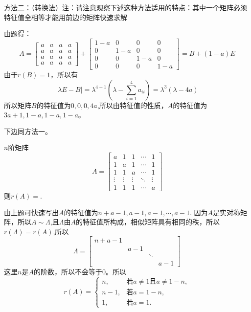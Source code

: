 \documentclass{article}
\begin{document}
\begin{jie}
方法二：（转换法）\textcolor[rgb]{1.00,0.00,0.00}{注：请注意观察下述这种方法适用的特点：其中一个矩阵必须特征值全相等才能用前边的矩阵快速求解}

由题得：
\begin{equation*}A=
  \begin{bmatrix}
    a & a& a& a \\
    a & a& a& a \\
    a & a& a& a \\
    a & a& a& a
  \end{bmatrix}+
   \begin{bmatrix}
    1-a & 0& 0& 0 \\
    0 & 1-a& 0& 0 \\
    0 & 0& 1-a& 0 \\
    0 & 0& 0& 1-a
  \end{bmatrix}=B+(1-a)E
\end{equation*}
由于$r(B)=1$，所以有
\begin{equation*}
  |\lambda E -B|=\lambda^{4-1}\left(\lambda-\sum\limits_{i=1}^{4}a_{ii}\right)=
  \lambda^{3}\left(\lambda-4a\right)
\end{equation*}
所以矩阵$B$的特征值为$0,0,0,4a$,所以由特征值的性质，$A$的特征值为$3a+1,1-a,1-a,1-a$。

下边同方法一。
\end{jie}

$n$阶矩阵
\begin{equation*}
A=
\begin{bmatrix}
  a & 1 & 1 & \cdots & 1\\
 1 & a & 1&\cdots & 1\\
 1 & 1 & a & \cdots &1\\
 \vdots&\vdots&\vdots&\ddots&\vdots\\
 1&1&1&\cdots&a
\end{bmatrix}
\end{equation*}
则$r(A)=$\underline{\hphantom{~~~~~~~~~~~~~}}.

\begin{jie}
由上题可快速写出$A$的特征值为$n+a-1,a-1,a-1,\cdots,a-1$.
因为$A$是实对称矩阵，所以$A\sim \Lambda$,且$\Lambda$由$A$的特征值所构成，相似矩阵具有相同的秩，所以$r(\Lambda)=r(A)$,所以
\begin{equation*}
\Lambda=
\begin{bmatrix}
  n+a-1 & && \\
   & a-1 &&\\
   &&\ddots&\\
   &&&a-1
\end{bmatrix}
\end{equation*}
这里$n$是$A$的阶数，所以不会等于$0$。所以
\begin{equation*}r(A)=
  \begin{cases}
  n,&\text{若}a\neq 1\text{且}a\neq 1-n,\\
  n-1,&\text{若}a=1-n,\\
  1,&\text{若}a=1.
  \end{cases}
\end{equation*}
\end{jie}
\end{document}
